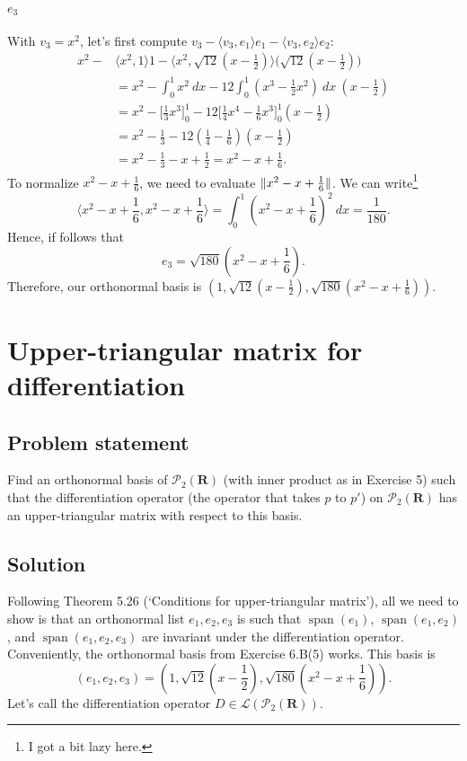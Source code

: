 \documentclass{article}
\begin{document}
\paragraph{$e_3$}
With $v_3=x^2$, let's first compute $v_3-\langle v_3,e_1\rangle e_1-\langle v_3,e_2\rangle e_2$:
\begin{align*}
    x^2-&\langle x^2,1\rangle 1-\langle x^2,\sqrt{12}(x-\frac{1}{2})\rangle\big(\sqrt{12}(x-\frac{1}{2})\big)\\
    &=x^2-\int_0^1x^2\ dx-12\int_0^1(x^3-\frac{1}{2}x^2)\ dx\ (x-\frac{1}{2})\\
    &=x^2-\Big[ \frac{1}{3}x^3 \Big]_0^1-12\Big[ \frac{1}{4}x^4-\frac{1}{6}x^3 \Big]_0^1(x-\frac{1}{2})\\
    &=x^2-\frac{1}{3}-12(\frac{1}{4}-\frac{1}{6})(x-\frac{1}{2})\\
    &=x^2-\frac{1}{3}-x+\frac{1}{2}=x^2-x+\frac{1}{6}.
\end{align*}
To normalize $x^2-x+\frac{1}{6}$, we need to evaluate $\lVert x^2-x+\frac{1}{6}\rVert$. 
We can write\footnote{I got a bit lazy here.}
\[\langle x^2-x+\frac{1}{6},x^2-x+\frac{1}{6}\rangle=\int_0^1(x^2-x+\frac{1}{6})^2\ dx=\frac{1}{180}.\]
Hence, if follows that
\[e_3=\sqrt{180}(x^2-x+\frac{1}{6}).\]
Therefore, our orthonormal basis is $(1,\sqrt{12}(x-\frac{1}{2}),\sqrt{180}(x^2-x+\frac{1}{6}))$.

\clearpage

\section{Upper-triangular matrix for differentiation}
\subsection*{Problem statement}
Find an orthonormal basis of $\mathcal{P}_2(\mathbf{R})$ (with inner product as in Exercise 5) such that the differentiation operator (the operator that takes $p$ to $p'$) on $\mathcal{P}_2(\mathbf{R})$ has an upper-triangular matrix with respect to this basis.

\subsection*{Solution}
Following Theorem 5.26 (`Conditions for upper-triangular matrix'), all we need to show is that an orthonormal list $e_1,e_2,e_3$ is such that $\operatorname{span}(e_1)$, $\operatorname{span}(e_1,e_2)$, and $\operatorname{span}(e_1,e_2,e_3)$ are invariant under the differentiation operator. 
Conveniently, the orthonormal basis from Exercise 6.B(5) works. 
This basis is 
\[(e_1,e_2,e_3)=(1,\sqrt{12}(x-\frac{1}{2}),\sqrt{180}(x^2-x+\frac{1}{6})).\]
Let's call the differentiation operator $D\in\mathcal{L}(\mathcal{P}_2(\mathbf{R}))$.
\end{document}
